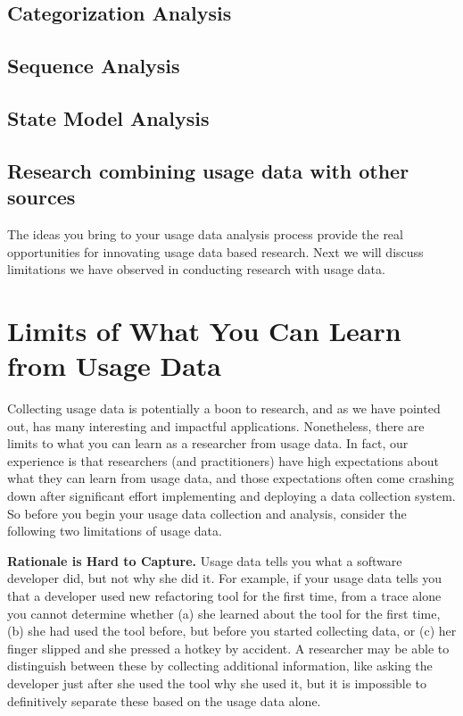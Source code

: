\subsection{Categorization Analysis}


\subsection{Sequence Analysis}


\subsection{State Model Analysis}


\subsection{Research combining usage data with other sources}



The ideas you bring to your usage data analysis process provide the real opportunities for innovating usage data based research.  Next we will discuss limitations we have observed in conducting research with usage data.

\section{Limits of What You Can Learn from Usage Data}
\label{sec:limitations}

Collecting usage data is potentially a boon to research, and as we have
pointed out, has many interesting and impactful applications.
Nonetheless, there are limits to what you can learn as a researcher
from usage data.
In fact, our experience is that researchers (and practitioners) have 
high expectations about what they can learn from usage data, and those
expectations often come crashing down after significant effort implementing
and deploying a data collection system.
So before you begin your usage data collection and analysis, consider
the following two limitations of usage data.

\textbf{Rationale is Hard to Capture.}
Usage data tells you what a software developer did, but not
why she did it.
For example, if your usage data tells you that a developer used 
new refactoring tool for the first time, from a trace alone you cannot determine whether
(a) she learned about the tool for the first time, (b) she had used the tool before,
but before you started collecting data, or (c) her finger slipped and 
she pressed a hotkey by accident.
A researcher may be able to distinguish between these by collecting additional information,
like asking the developer just after she used the tool why she used it,
but it is impossible to definitively separate these based on the 
usage data alone.

